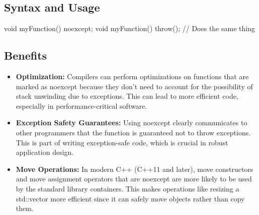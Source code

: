 \documentclass{report}
\begin{document}
    \bigbreak \noindent 
    \subsection{Syntax and Usage}
    \bigbreak \noindent 
    \begin{cppcode}
        void myFunction() noexcept;
        void myFunction() throw(); // Does the same thing
    \end{cppcode}
    \bigbreak \noindent 

    \bigbreak \noindent 
    \subsection{Benefits}
    \begin{itemize}
        \item \textbf{Optimization:} Compilers can perform optimizations on functions that are marked as noexcept because they don't need to account for the possibility of stack unwinding due to exceptions. This can lead to more efficient code, especially in performance-critical software.
        \item \textbf{Exception Safety Guarantees:} Using noexcept clearly communicates to other programmers that the function is guaranteed not to throw exceptions. This is part of writing exception-safe code, which is crucial in robust application design.
        \item \textbf{Move Operations:} In modern C++ (C++11 and later), move constructors and move assignment operators that are noexcept are more likely to be used by the standard library containers. This makes operations like resizing a std::vector more efficient since it can safely move objects rather than copy them.
    \end{itemize}

    \pagebreak 
\end{document}
